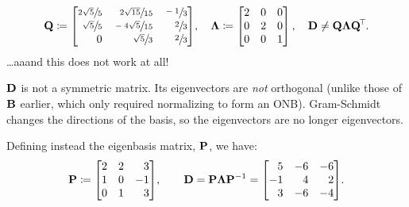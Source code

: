 \documentclass[11pt]{article}
\begin{document}
\begin{enumerate}
\begin{enumerate}[align=left]
\[                        \mat{Q}
                        \coloneq
                        \begin{bmatrix*}[r]
                            \sfrac{2 \sqrt{5}}{5} & \sfrac{2 \sqrt{15}}{15} & \sfrac{-1}{3} \\
                            \sfrac{\sqrt{5}}{5}   & \sfrac{-4\sqrt{5}}{15}  & \sfrac{2}{3} \\
                            0                     & \sfrac{\sqrt{5}}{3}     & \sfrac{2}{3} \\
                        \end{bmatrix*}
                        \! ,
                        \quad
                        \mat{\Lambda}
                        \coloneq
                        \begin{bmatrix}
                            2 & 0 & 0 \\
                            0 & 2 & 0 \\
                            0 & 0 & 1 \\
                        \end{bmatrix}
                        ,
                        \quad
                        \mat{D} \neq \mat{Q} \mat{\Lambda} \mat{Q}^{\T}.
                    \]
                    \dots aaand this does not work at all!

                    $\mathbf{D}$ is not a symmetric matrix.  Its eigenvectors are \emph{not} orthogonal
                    (unlike those of $\mathbf{B}$ earlier, which only required normalizing to form an
                    ONB).  Gram-Schmidt changes the directions of the basis, so the eigenvectors are
                    no longer eigenvectors.

                    Defining instead the eigenbasis matrix, $\mathbf{P}$, we have:
                    \[
                        \mat{P}
                        \coloneq
                        \begin{bmatrix*}[r]
                            2 & 2 & 3 \\
                            1 & 0 & -1 \\
                            0 & 1 & 3 \\
                        \end{bmatrix*}
                        \! ,
                        \qquad
                        \mat{D} = \mat{P} \mat{\Lambda} \mat{P}^{-1}
                        =
                        \begin{bmatrix*}[r]
                            5  & -6 & -6 \\
                            -1 & 4  & 2  \\
                            3  & -6 & -4 \\
                        \end{bmatrix*}
                        \! .
                    \]


\end{enumerate}
\end{enumerate}
\end{document}
